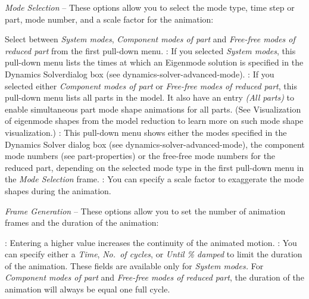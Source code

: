 \begin{bulletlist}
\item{\sl Mode Selection} --
  These options allow you to select the mode type, time step or part,
  mode number, and a scale factor for the animation:

  \begin{itemize}
  \subitem
    Select between {\sl System modes}, {\sl Component modes of part} and
    {\sl Free-free modes of reduced part} from the first pull-down menu.
   :
    If you selected {\sl System modes}, this pull-down menu lists the times at
    which an Eigenmode solution is specified in the Dynamics Solverdialog box
    (see 
    {dynamics-solver-advanced-mode}).
   :
    If you selected either {\sl Component modes of part} or
    {\sl Free-free modes of reduced part}, this pull-down menu lists all parts
    in the model. It also have an entry {\sl(All parts)} to enable simultaneous
    part mode shape animations for all parts. (See
               {Visualization of eigenmode shapes from the model reduction}
    to learn more on such mode shape visualization.)
   :
    This pull-down menu shows either the modes specified in the Dynamics Solver
    dialog box (see 
    {dynamics-solver-advanced-mode}), the component mode numbers (see
                  {part-properties})
    or the free-free mode numbers for the reduced part,
    depending on the selected  mode type in the first pull-down menu in the
    {\sl Mode Selection} frame.
   : You can
    specify a scale factor to exaggerate the mode shapes during the animation.
  \end{itemize}


\item{\sl Frame Generation} --
  These options allow you to set the number of animation frames and the
  duration of the animation:

  \begin{itemize}
   :
    Entering a higher value increases the continuity of the animated motion.
   :
    You can specify either a {\sl Time}, {\sl No.\ of cycles},
    or {\sl Until \% damped} to limit the duration of the animation.
    These fields are available only for {\sl System modes.}
    For {\sl Component modes of part} and {\sl Free-free modes of reduced part},
    the duration of the animation will always be equal one full cycle.
  \end{itemize}


\end{bulletlist}
